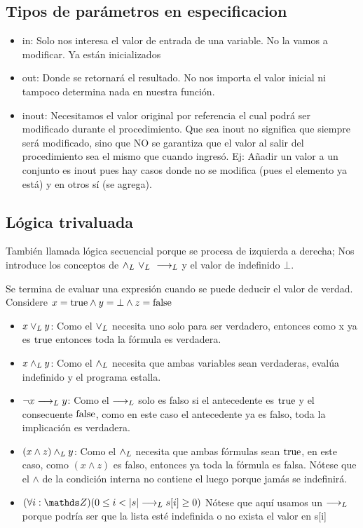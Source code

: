 \documentclass[10pt,a4paper]{article}
\begin{document}
\subsection*{Tipos de parámetros en especificacion}
\begin{itemize}
    \item in: Solo nos interesa el valor de entrada de una variable. No la vamos a modificar. Ya están inicializados
    \item out: Donde se retornará el resultado. No nos importa el valor inicial ni tampoco determina nada en nuestra función.
    \item inout: Necesitamos el valor original por referencia el cual podrá ser modificado durante el procedimiento. Que sea inout no significa que siempre será modificado, sino que NO se garantiza que el valor al salir del procedimiento sea el mismo que cuando ingresó. Ej: Añadir un valor a un conjunto es inout pues hay casos donde no se modifica (pues el elemento ya está) y en otros sí (se agrega).
\end{itemize}
\subsection*{Lógica trivaluada}
También llamada lógica secuencial porque se procesa de izquierda a derecha; Nos introduce los conceptos de \(\land _L \ \lor _L \ \longrightarrow _L\) y el valor de indefinido \(\bot\).

Se termina de evaluar una expresión cuando se puede deducir el valor de verdad. \\


Considere \(x = \mathrm{true} \land y = \bot \land z = \mathrm{false} \)
\begin{itemize}
    \item \(x \lor _L y\): Como el \(\lor _L\) necesita uno solo para ser verdadero, entonces como x ya es \(\mathrm{true}\) entonces toda la fórmula es verdadera.
    \item \(x \land _L y\): Como el \(\land _L\) necesita que ambas variables sean verdaderas, evalúa indefinido y el programa estalla.
    \item \(\neg x \longrightarrow _L y\): Como el \(\longrightarrow _L\) solo es falso si el antecedente es  \(\mathrm{true}\) y el consecuente \(\mathrm{false}\), como en este caso el antecedente ya es falso, toda la implicación es verdadera.
    \item \((x \land z) \land _L y\): Como el \(\land _L\) necesita que ambas fórmulas sean \(\mathrm{true}\), en este caso, como \((x \land z)\) es falso, entonces ya toda la fórmula es falsa. Nótese que el \(\land\) de la condición interna no contiene el luego porque jamás se indefinirá.
    \item \((\forall i: \ent)(0 \le i < \longitud{s} \implicaLuego s[i] \ge 0)\) Nótese que aquí usamos un \(\longrightarrow _L\) porque podría ser que la lista esté indefinida o no exista el valor en s[i]
\end{itemize}
\end{document}
